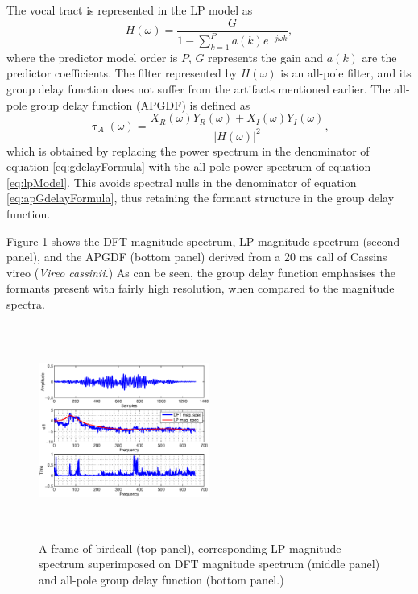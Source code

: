 \documentclass[a4paper]{article}
\begin{document}
The vocal tract is represented in the LP model as
\begin{equation}
H(\omega) = \frac{G}{1-\sum_{k=1}^{P} a(k) e^{-j \omega k}},
\label{eq:lpModel}
\end{equation}
where the predictor model order is $P$, $G$ represents the gain and $a(k)$ are
the predictor coefficients\cite{makhoul}.
The filter represented by $H(\omega)$ is an all-pole filter, and its group delay
function does not suffer from the artifacts mentioned earlier. The all-pole 
group delay function (APGDF) is defined as
\begin{equation}
\uptau_A(\omega) = \frac{X_R(\omega) Y_R(\omega) + X_I(\omega)
Y_I(\omega)}{|H(\omega)|^2},
\label{eq:apGdelayFormula}
\end{equation}
which is obtained by replacing the power spectrum in the denominator of equation
\ref{eq:gdelayFormula} with the all-pole power spectrum of equation
\ref{eq:lpModel}. This avoids spectral nulls in the denominator of equation
\ref{eq:apGdelayFormula}, thus retaining the formant structure in the group
delay function.

Figure \ref{fig:all-pole} shows the DFT magnitude spectrum, LP magnitude
spectrum (second panel), and the APGDF (bottom panel) derived from a 20 ms call 
of Cassins vireo (\textit{Vireo cassinii.}) As can be seen, the group delay
function emphasises the formants present with fairly high resolution, when
compared to the magnitude spectra.

\begin{figure}[h]
\includegraphics[width=0.5\textwidth,height=7cm]
{apgd.eps}
\caption{ A frame of birdcall (top panel), corresponding LP
magnitude spectrum superimposed on DFT magnitude spectrum (middle panel) and
all-pole group delay function (bottom panel.)  }
\label{fig:all-pole}
\end{figure}
\end{document}
